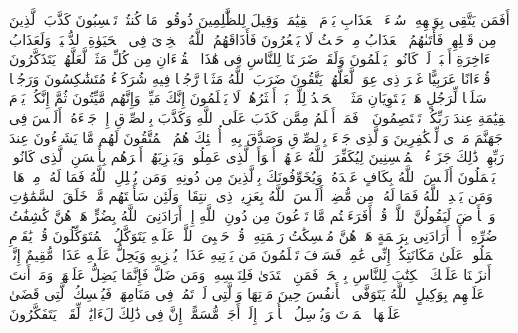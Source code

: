 \stopbuffer
\startbuffer[\q:39:24]
أَفَمَن یَتَّقِی بِوَجۡهِهِۦ سُوۤءَ ٱلۡعَذَابِ یَوۡمَ ٱلۡقِیَٰمَةِۚ وَقِیلَ لِلظَّٰلِمِینَ ذُوقُوا۟ مَا كُنتُمۡ تَكۡسِبُونَ%
\stopbuffer
\startbuffer[\q:39:25]
كَذَّبَ ٱلَّذِینَ مِن قَبۡلِهِمۡ فَأَتَىٰهُمُ ٱلۡعَذَابُ مِنۡ حَیۡثُ لَا یَشۡعُرُونَ%
\stopbuffer
\startbuffer[\q:39:26]
فَأَذَاقَهُمُ ٱللَّهُ ٱلۡخِزۡیَ فِی ٱلۡحَیَوٰةِ ٱلدُّنۡیَاۖ وَلَعَذَابُ ٱلۡءَاخِرَةِ أَكۡبَرُۚ لَوۡ كَانُوا۟ یَعۡلَمُونَ%
\stopbuffer
\startbuffer[\q:39:27]
وَلَقَدۡ ضَرَبۡنَا لِلنَّاسِ فِی هَٰذَا ٱلۡقُرۡءَانِ مِن كُلِّ مَثَلࣲ لَّعَلَّهُمۡ یَتَذَكَّرُونَ%
\stopbuffer
\startbuffer[\q:39:28]
قُرۡءَانًا عَرَبِیًّا غَیۡرَ ذِی عِوَجࣲ لَّعَلَّهُمۡ یَتَّقُونَ%
\stopbuffer
\startbuffer[\q:39:29]
ضَرَبَ ٱللَّهُ مَثَلࣰا رَّجُلࣰا فِیهِ شُرَكَاۤءُ مُتَشَٰكِسُونَ وَرَجُلࣰا سَلَمࣰا لِّرَجُلٍ هَلۡ یَسۡتَوِیَانِ مَثَلًاۚ ٱلۡحَمۡدُ لِلَّهِۚ بَلۡ أَكۡثَرُهُمۡ لَا یَعۡلَمُونَ%
\stopbuffer
\startbuffer[\q:39:30]
إِنَّكَ مَیِّتࣱ وَإِنَّهُم مَّیِّتُونَ%
\stopbuffer
\startbuffer[\q:39:31]
ثُمَّ إِنَّكُمۡ یَوۡمَ ٱلۡقِیَٰمَةِ عِندَ رَبِّكُمۡ تَخۡتَصِمُونَ%
\stopbuffer
\startbuffer[\q:39:32]
۞ فَمَنۡ أَظۡلَمُ مِمَّن كَذَبَ عَلَى ٱللَّهِ وَكَذَّبَ بِٱلصِّدۡقِ إِذۡ جَاۤءَهُۥۤۚ أَلَیۡسَ فِی جَهَنَّمَ مَثۡوࣰى لِّلۡكَٰفِرِینَ%
\stopbuffer
\startbuffer[\q:39:33]
وَٱلَّذِی جَاۤءَ بِٱلصِّدۡقِ وَصَدَّقَ بِهِۦۤ أُو۟لَٰۤئِكَ هُمُ ٱلۡمُتَّقُونَ%
\stopbuffer
\startbuffer[\q:39:34]
لَهُم مَّا یَشَاۤءُونَ عِندَ رَبِّهِمۡۚ ذَٰلِكَ جَزَاۤءُ ٱلۡمُحۡسِنِینَ%
\stopbuffer
\startbuffer[\q:39:35]
لِیُكَفِّرَ ٱللَّهُ عَنۡهُمۡ أَسۡوَأَ ٱلَّذِی عَمِلُوا۟ وَیَجۡزِیَهُمۡ أَجۡرَهُم بِأَحۡسَنِ ٱلَّذِی كَانُوا۟ یَعۡمَلُونَ%
\stopbuffer
\startbuffer[\q:39:36]
أَلَیۡسَ ٱللَّهُ بِكَافٍ عَبۡدَهُۥۖ وَیُخَوِّفُونَكَ بِٱلَّذِینَ مِن دُونِهِۦۚ وَمَن یُضۡلِلِ ٱللَّهُ فَمَا لَهُۥ مِنۡ هَادࣲ%
\stopbuffer
\startbuffer[\q:39:37]
وَمَن یَهۡدِ ٱللَّهُ فَمَا لَهُۥ مِن مُّضِلٍّۗ أَلَیۡسَ ٱللَّهُ بِعَزِیزࣲ ذِی ٱنتِقَامࣲ%
\stopbuffer
\startbuffer[\q:39:38]
وَلَئِن سَأَلۡتَهُم مَّنۡ خَلَقَ ٱلسَّمَٰوَٰتِ وَٱلۡأَرۡضَ لَیَقُولُنَّ ٱللَّهُۚ قُلۡ أَفَرَءَیۡتُم مَّا تَدۡعُونَ مِن دُونِ ٱللَّهِ إِنۡ أَرَادَنِیَ ٱللَّهُ بِضُرٍّ هَلۡ هُنَّ كَٰشِفَٰتُ ضُرِّهِۦۤ أَوۡ أَرَادَنِی بِرَحۡمَةٍ هَلۡ هُنَّ مُمۡسِكَٰتُ رَحۡمَتِهِۦۚ قُلۡ حَسۡبِیَ ٱللَّهُۖ عَلَیۡهِ یَتَوَكَّلُ ٱلۡمُتَوَكِّلُونَ%
\stopbuffer
\startbuffer[\q:39:39]
قُلۡ یَٰقَوۡمِ ٱعۡمَلُوا۟ عَلَىٰ مَكَانَتِكُمۡ إِنِّی عَٰمِلࣱۖ فَسَوۡفَ تَعۡلَمُونَ%
\stopbuffer
\startbuffer[\q:39:40]
مَن یَأۡتِیهِ عَذَابࣱ یُخۡزِیهِ وَیَحِلُّ عَلَیۡهِ عَذَابࣱ مُّقِیمٌ%
\stopbuffer
\startbuffer[\q:39:41]
إِنَّاۤ أَنزَلۡنَا عَلَیۡكَ ٱلۡكِتَٰبَ لِلنَّاسِ بِٱلۡحَقِّۖ فَمَنِ ٱهۡتَدَىٰ فَلِنَفۡسِهِۦۖ وَمَن ضَلَّ فَإِنَّمَا یَضِلُّ عَلَیۡهَاۖ وَمَاۤ أَنتَ عَلَیۡهِم بِوَكِیلٍ%
\stopbuffer
\startbuffer[\q:39:42]
ٱللَّهُ یَتَوَفَّى ٱلۡأَنفُسَ حِینَ مَوۡتِهَا وَٱلَّتِی لَمۡ تَمُتۡ فِی مَنَامِهَاۖ فَیُمۡسِكُ ٱلَّتِی قَضَىٰ عَلَیۡهَا ٱلۡمَوۡتَ وَیُرۡسِلُ ٱلۡأُخۡرَىٰۤ إِلَىٰۤ أَجَلࣲ مُّسَمًّىۚ إِنَّ فِی ذَٰلِكَ لَءَایَٰتࣲ لِّقَوۡمࣲ یَتَفَكَّرُونَ%
\stopbuffer
